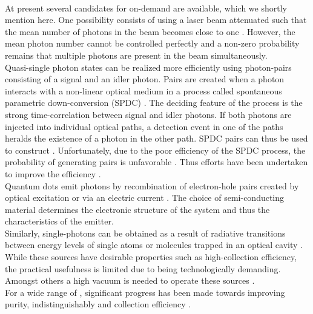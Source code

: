	\\
	At present several candidates for on-demand \spss are available, which we shortly mention here. One possibility consists of using a laser beam attenuated such that the mean number of photons in the beam becomes close to one \cite{gisin2002quantum, eisaman2011invited, migdall2013single}. However, the mean photon number cannot be controlled perfectly and a non-zero probability remains that multiple photons are present in the beam simultaneously.
	\\
	Quasi-single photon states can be realized more efficiently using photon-pairs consisting of a signal and an idler photon. Pairs are created when a photon interacts with a non-linear optical medium in a process called spontaneous parametric down-conversion (SPDC) \cite{shih2003entangled, klyshko1977utilization, fasel2004high, ware2004single, brida2012extremely,SiquteProject}. The deciding feature of the process is the strong time-correlation between signal and idler photons. If both photons are injected into individual optical paths, a detection event in one of the paths heralds the existence of a photon in the other path. SPDC pairs can thus be used to construct \spss. Unfortunately, due to the poor efficiency of the SPDC process, the probability of generating pairs is unfavorable \cite{zwinkels2010photometry, Bock2016}. Thus efforts have been undertaken to improve the efficiency \cite{Bock2016, vrehavcek2003multiple, brida2008experimental}.
	\\
	Quantum dots emit photons by recombination of electron-hole pairs created by optical excitation or via an electric current \cite{Yuan2002, buckley2012engineered}. The choice of semi-conducting material determines the electronic structure of the system and thus the characteristics of the emitter.
	\\
	Similarly, single-photons can be obtained as a result of radiative transitions between energy levels of single atoms or molecules trapped in an optical cavity \cite{Kuhn2002}. While these sources have desirable properties such as high-collection efficiency, the practical usefulness is limited due to being technologically demanding. Amongst others a high vacuum is needed to operate these sources \cite{zwinkels2010photometry}.
	\\
	For a wide range of \spss, significant progress has been made towards improving purity, indistinguishably and collection efficiency \cite{lee2011planar, chen201199, ates2013improving, PhysRevLett.116.020401, somaschi2016near}.
	\\

